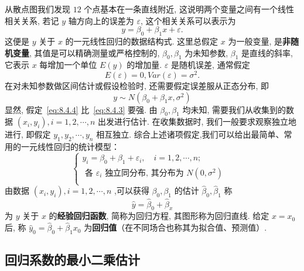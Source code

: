 \begin{example}
    从散点图我们发现 $12$ 个点基本在一条直线附近, 这说明两个变量之间有一个线性相关关系, 若记 $y$ 轴方向上的误差为 $\varepsilon$, 这个相关关系可以表示为
    \begin{equation}
      y = \beta_0 + \beta_1 x + \varepsilon .
    \end{equation}
    这便是 $y$ 关于 $x$ 的一元线性回归的数据结构式. 这里总假定 $x$ 为一般变量, 是\textbf{非随机变量}, 其值是可以精确测量或严格控制的, $\beta_0, \beta_1$ 为未知参数, $\beta_1$ 是直线的斜率, 它表示 $x$ 每增加一个单位 $E(y)$ 的增加量. $\varepsilon$ 是随机误差, 通常假定
    \begin{equation}\label{eq:8.4.3}
      E(\varepsilon) = 0, Var(\varepsilon) = \sigma^{2}.
    \end{equation}
    在对未知参数做区间估计或假设检验时, 还需要假定误差服从正态分布, 即
    \begin{equation}\label{eq:8.4.4}
      y \sim N(\beta_0 + \beta_1 x, \sigma^2)
    \end{equation}
    显然, 假定~\ref{eq:8.4.4} 比~\ref{eq:8.4.3} 要强.
    由 $\beta_0, \beta_1$ 均未知, 需要我们从收集到的数据 $(x_i, y_i), i=1,2, \cdots, n$ 出发进行估计. 在收集数据时, 我们一般要求观察独立地进行, 即假定 $y_{1}, y_{2},\cdots, y_{n}$ 相互独立. 综合上述诸项假定,我们可以给出最简单、常用的一元线性回归的统计模型：
    \begin{equation}\label{eq:8.4.5}
    \begin{cases}
      y_i = \beta _0 + \beta _1 + \varepsilon_{i} , \quad i =1, 2, \cdots, n; & \\
      \text{ 各 }\varepsilon_{i} \text{ 独立同分布, 其分布为 } N(0, \sigma^{2}) & \\
    \end{cases}
    \end{equation}
    由数据 $(x_{i}, y_{i}), i=1,2, \cdots, n$ ,可以获得 $\beta_0, \beta_1$ 的估计 $\hat{\beta}_0, \hat{\beta}_1$ 称
    \begin{equation}\label{eq:8.4.6}
    \hat{y} = \hat{\beta}_0 + \hat{\beta} _x
    \end{equation}
    为 $y$ 关于 $x$ 的\textbf{经验回归函数}, 简称为回归方程, 其图形称为回归直线. 给定 $x=x_0$ 后, 称 $ \hat{y}_{0} = \hat{\beta}_0 + \hat{\beta}_1 x_{0}$ 为\textbf{回归值}（在不同场合也称其为拟合值、预测值）.
\end{example}

\subsection{回归系数的最小二乘估计}\label{ssec:8.4.3}

